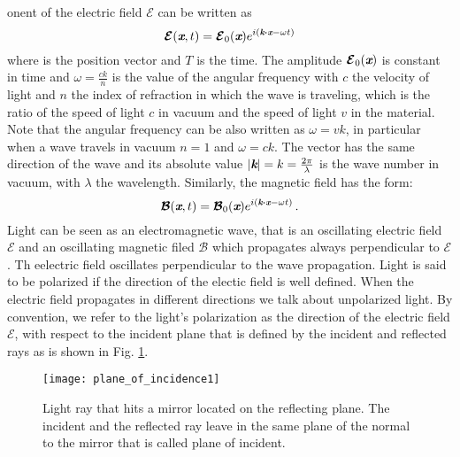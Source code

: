 onent of the electric field $\boldsymbol{\mathcal{E}}$ can be written as
\begin{equation}\label{electric_field}
\boldsymbol{\mathcal{E}}(\textit{\textbf{x}}, t) = \boldsymbol{\mathcal{E}}_0(\textit{\textbf{x}} )e^{i( \textit{\textbf{k}}\boldsymbol{\cdot}\textit{\textbf{x}}-\omega t )}
\end{equation}
where  is the position vector and $T$ is the time. The amplitude $\boldsymbol{\mathcal{E}}_0(\textit{\textbf{x}})$ is constant in time and $\omega = \frac{c k}{n}$ is the value of the angular frequency with $c$ the velocity of light and $n$ the index of refraction in which the wave is traveling, which is the ratio of the speed of light $c$ in vacuum and the speed of light $v$ in the material. Note that the angular frequency can be also written as $\omega = vk$, in particular when a wave travels in vacuum $n=1$ and $\omega=ck$. The vector  has the same direction of the wave and its absolute value 
$|\textit{\textbf{k}}| = k = \frac{2\pi}{\lambda}$ is the wave number in vacuum, with $\lambda$ the wavelength. Similarly, the magnetic field has the form:
\begin{equation}
\boldsymbol{\mathcal{B}}(\textit{\textbf{x}}, t) = \boldsymbol{\mathcal{B}}_0(\textit{\textbf{x}}) e^{i( \textit{\textbf{k}}\boldsymbol{\cdot} \textit{\textbf{x}}-\omega t )}\,.
\end{equation}
Light can be seen as an electromagnetic wave, that is an oscillating electric field $\boldsymbol{\mathcal{E}}$ and an oscillating magnetic filed $\boldsymbol{\mathcal{B}}$ which propagates  always perpendicular to $\boldsymbol{\mathcal{E}}$. Th eelectric field oscillates perpendicular to the wave propagation.
Light is said to be polarized if the direction of the electic field is well defined. When the electric field propagates in different directions we talk about unpolarized light. 
By convention, we refer to the light's polarization as the direction of the electric field $\boldsymbol{\mathcal{E}}$, \cite{feynman1964feynman} with respect to the incident plane that is defined by the incident and reflected rays as is shown in Fig. \ref{fig:planeofincidence}. 
\begin{figure}[h]
 \label{fig:planeofincidence}
     \begin{center}
     \texttt{[image: plane\_of\_incidence1]}
     \end{center}
     \caption{Light ray that hits a mirror located on the reflecting plane. The incident and the reflected ray leave in the same plane of the normal to the mirror that is called plane of incident.}
\label{fig:planeofincidence}
 \end{figure}
